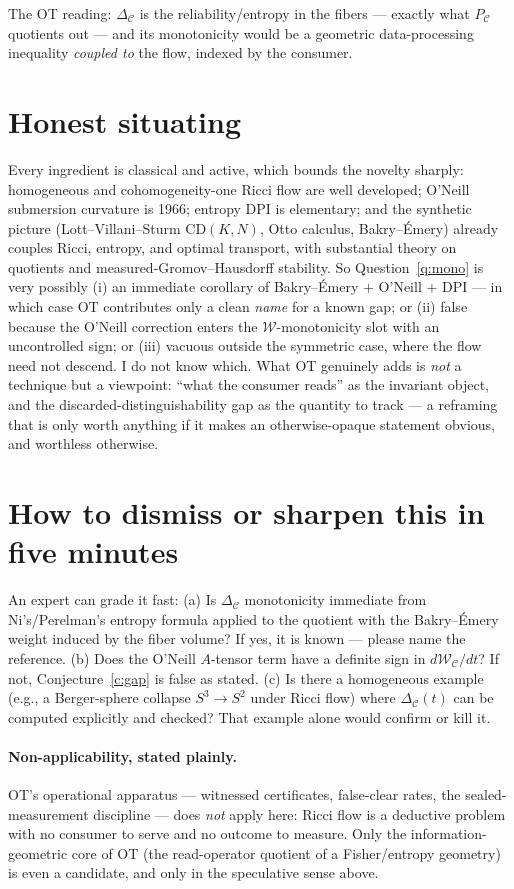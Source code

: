\documentclass[11pt]{article}
\newcommand{\PC}{P_{\mathcal C}}
\begin{document}
The OT reading: $\Delta_{\mathcal C}$ is the reliability/entropy in the fibers ---
exactly what $\PC$ quotients out --- and its monotonicity would be a geometric
data-processing inequality \emph{coupled to} the flow, indexed by the consumer.

\section{Honest situating}
Every ingredient is classical and active, which bounds the novelty sharply:
homogeneous and cohomogeneity-one Ricci flow are well developed; O'Neill
submersion curvature is 1966; entropy DPI is elementary; and the synthetic
picture (Lott--Villani--Sturm $\mathrm{CD}(K,N)$, Otto calculus, Bakry--\'Emery)
already couples Ricci, entropy, and optimal transport, with substantial theory on
quotients and measured-Gromov--Hausdorff stability. So Question~\ref{q:mono} is
very possibly (i) an immediate corollary of Bakry--\'Emery $+$ O'Neill $+$ DPI ---
in which case OT contributes only a clean \emph{name} for a known gap; or (ii)
false because the O'Neill correction enters the $\mathcal W$-monotonicity slot
with an uncontrolled sign; or (iii) vacuous outside the symmetric case, where the
flow need not descend. I do not know which. What OT genuinely adds is
\emph{not} a technique but a viewpoint: ``what the consumer reads'' as the
invariant object, and the discarded-distinguishability gap as the quantity to
track --- a reframing that is only worth anything if it makes an otherwise-opaque
statement obvious, and worthless otherwise.

\section{How to dismiss or sharpen this in five minutes}
An expert can grade it fast: (a) Is $\Delta_{\mathcal C}$ monotonicity immediate
from Ni's/Perelman's entropy formula applied to the quotient with the
Bakry--\'Emery weight induced by the fiber volume? If yes, it is known --- please
name the reference. (b) Does the O'Neill $A$-tensor term have a definite sign in
$d\mathcal W_{\mathcal C}/dt$? If not, Conjecture~\ref{c:gap} is false as stated.
(c) Is there a homogeneous example (e.g., a Berger-sphere collapse
$S^3\to S^2$ under Ricci flow) where $\Delta_{\mathcal C}(t)$ can be computed
explicitly and checked? That example alone would confirm or kill it.

\paragraph{Non-applicability, stated plainly.} OT's operational apparatus ---
witnessed certificates, false-clear rates, the sealed-measurement discipline ---
does \emph{not} apply here: Ricci flow is a deductive problem with no consumer to
serve and no outcome to measure. Only the information-geometric core of OT (the
read-operator quotient of a Fisher/entropy geometry) is even a candidate, and
only in the speculative sense above.
\end{document}
